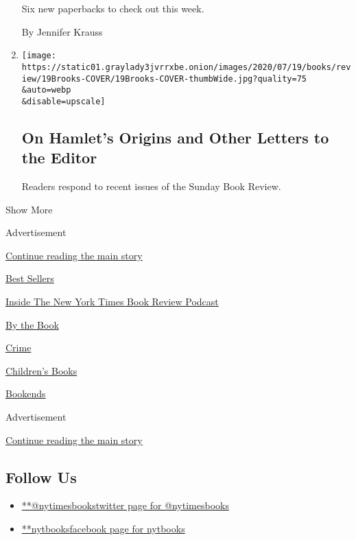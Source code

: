 \begin{enumerate}
  Six new paperbacks to check out this week.

  By Jennifer Krauss
\item
  \href{/2020/07/31/books/review/on-hamlets-origins-and-other-letters-to-the-editor.html}{}

  \texttt{[image: https://static01.graylady3jvrrxbe.onion/images/2020/07/19/books/review/19Brooks-COVER/19Brooks-COVER-thumbWide.jpg?quality=75\\\&auto=webp\\\&disable=upscale]}

  \hypertarget{on-hamlets-origins-and-other-letters-to-the-editor}{%
  \subsection{On Hamlet's Origins and Other Letters to the
  Editor}\label{on-hamlets-origins-and-other-letters-to-the-editor}}

  Readers respond to recent issues of the Sunday Book Review.
\end{enumerate}

Show More

Advertisement

\protect\hyperlink{after-mid2}{Continue reading the main story}

\href{https://www.nytimes3xbfgragh.onion/best-sellers-books/overview.html}{Best
Sellers}

\href{https://www.nytimes3xbfgragh.onion/column/book-review-podcast}{Inside
The New York Times Book Review Podcast}

\href{https://www.nytimes3xbfgragh.onion/column/by-the-book}{By the
Book}

\href{https://www.nytimes3xbfgragh.onion/column/crime}{Crime}

\href{https://www.nytimes3xbfgragh.onion/column/childrens-books}{Children's
Books}

\href{https://www.nytimes3xbfgragh.onion/column/bookends}{Bookends}

Advertisement

\protect\hyperlink{after-mktg}{Continue reading the main story}

\hypertarget{follow-us}{%
\subsection{Follow Us}\label{follow-us}}

\begin{itemize}
\tightlist
\item
  \href{https://twitter.com/nytimesbooks}{**@nytimesbookstwitter page
  for @nytimesbooks}
\item
  \href{https://www.facebookcorewwwi.onion/nytbooks}{**nytbooksfacebook
  page for nytbooks}
\end{itemize}

